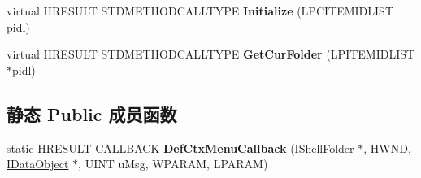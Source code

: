 \begin{DoxyCompactItemize}
\item 
\mbox{\label{class_c_common_folder_ac414792a7e79c30d4ec4e62056692e43}} 
virtual H\+R\+E\+S\+U\+LT S\+T\+D\+M\+E\+T\+H\+O\+D\+C\+A\+L\+L\+T\+Y\+PE {\bfseries Initialize} (L\+P\+C\+I\+T\+E\+M\+I\+D\+L\+I\+ST pidl)
\item 
\mbox{\label{class_c_common_folder_a7ba7da837989da389b41376f9b579bbc}} 
virtual H\+R\+E\+S\+U\+LT S\+T\+D\+M\+E\+T\+H\+O\+D\+C\+A\+L\+L\+T\+Y\+PE {\bfseries Get\+Cur\+Folder} (L\+P\+I\+T\+E\+M\+I\+D\+L\+I\+ST $\ast$pidl)
\end{DoxyCompactItemize}
\subsection*{静态 Public 成员函数}
\begin{DoxyCompactItemize}
\item 
\mbox{\label{class_c_common_folder_ab154f73b0f2bb79a0bbd51bd3e192d24}} 
static H\+R\+E\+S\+U\+LT C\+A\+L\+L\+B\+A\+CK {\bfseries Def\+Ctx\+Menu\+Callback} (\hyperlink{interface_i_shell_folder}{I\+Shell\+Folder} $\ast$, \hyperlink{interfacevoid}{H\+W\+ND}, \hyperlink{interface_i_data_object}{I\+Data\+Object} $\ast$, U\+I\+NT u\+Msg, W\+P\+A\+R\+AM, L\+P\+A\+R\+AM)
\end{DoxyCompactItemize}
